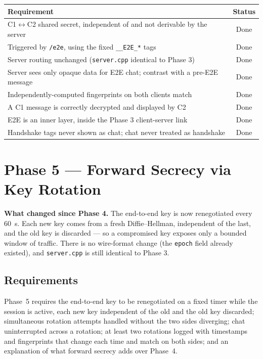 \documentclass[11pt,a4paper]{article}
\begin{document}
\begin{center}
\small
\begin{tabular}{@{}lc@{}}
\toprule
\textbf{Requirement} & \textbf{Status} \\
\midrule
C1$\leftrightarrow$C2 shared secret, independent of and not derivable by the server & Done \\
Triggered by \texttt{/e2e}, using the fixed \texttt{\_\_E2E\_*} tags & Done \\
Server routing unchanged (\texttt{server.cpp} identical to Phase 3) & Done \\
Server sees only opaque data for E2E chat; contrast with a pre-E2E message & Done \\
Independently-computed fingerprints on both clients match & Done \\
A C1 message is correctly decrypted and displayed by C2 & Done \\
E2E is an inner layer, inside the Phase 3 client-server link & Done \\
Handshake tags never shown as chat; chat never treated as handshake & Done \\
\bottomrule
\end{tabular}
\end{center}

\section{Phase 5 --- Forward Secrecy via Key Rotation}

\begin{keybox}
\textbf{What changed since Phase 4.} The end-to-end key is now renegotiated every 60~s. Each new key
comes from a fresh Diffie--Hellman, independent of the last, and the old key is discarded --- so a
compromised key exposes only a bounded window of traffic. There is no wire-format change (the
\texttt{epoch} field already existed), and \texttt{server.cpp} is still identical to Phase 3.
\end{keybox}

\subsection{Requirements}

Phase~5 requires the end-to-end key to be renegotiated on a fixed timer while the session is active,
each new key independent of the old and the old key discarded; simultaneous rotation attempts handled
without the two sides diverging; chat uninterrupted across a rotation; at least two rotations logged
with timestamps and fingerprints that change each time and match on both sides; and an explanation of
what forward secrecy adds over Phase~4.
\end{document}
